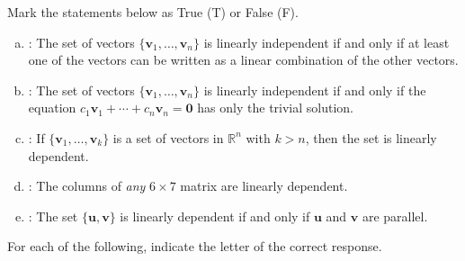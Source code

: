 \documentclass[12pt,letterpaper]{exam}
\begin{document}
\begin{questions}
\newpage
\question[10] Mark the statements below as True (T) or False (F). \par\vspace{1cm}

\begin{enumerate}[(a)]
\item \underline{\itshape\hspace{0.62cm}\hspace{0.6cm}}: The set of vectors $\{ \mathbf{v}_1, \ldots, \mathbf{v}_n \}$ is linearly independent if and only if at least one of the vectors can be written as a linear combination of the other vectors. \vfill %

\item \underline{\itshape\hspace{0.6cm}\hspace{0.6cm}}: The set of vectors $\{ \mathbf{v}_1, \ldots, \mathbf{v}_n \}$ is linearly independent if and only if the equation $c_1 \mathbf{v}_1 + \cdots + c_n \mathbf{v}_n= \mathbf{0}$ has only the trivial solution. \vfill %

\item \underline{\itshape\hspace{0.6cm}\hspace{0.6cm}}: If $\{ \mathbf{v}_1, \ldots, \mathbf{v}_k \}$ is a set of vectors in $\mathbb{R}^n$ with $k > n$, then the set is linearly dependent. \vfill %

\item \underline{\itshape\hspace{0.6cm}\hspace{0.6cm}}: The columns of \textit{any} $6 \times 7$ matrix are linearly dependent. \vfill %

\item \underline{\itshape\hspace{0.6cm}\hspace{0.6cm}}: The set $\{ \mathbf{u}, \mathbf{v} \}$ is linearly dependent if and only if $\mathbf{u}$ and $\mathbf{v}$ are parallel. \vfill %

\end{enumerate}
	


\newpage
\question[10] For each of the following, indicate the letter of the correct response. \par\vspace{0.3cm}


\end{questions}
\end{document}

